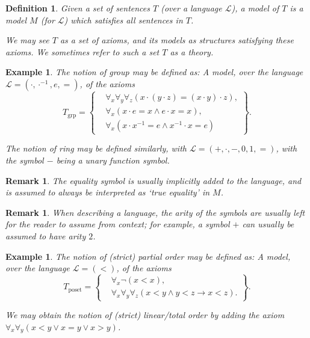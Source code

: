 \documentclass{article}
\newtheorem{remark}[theorem]{Remark}
\newtheorem{example}[theorem]{Example}
\newtheorem{definition}[theorem]{Definition}
\theoremstyle{nonumberplain}
\newcommand{\Lang}{\mathcal{L}}
\begin{document}
\begin{definition}
Given a set of sentences $T$ (over a language $\Lang$), a \emph{model of $T$} is a model $M$ (for $\Lang$) which satisfies all sentences in $T$.

We may see $T$ as a set of axioms, and its models as structures satisfying these axioms. We sometimes refer to such a set $T$ as a \emph{theory}.
\end{definition}

\begin{example}\label{ex:1}
The notion of group may be defined as: A model, over the language $\Lang = (\cdot, \cdot^{-1}, e, =)$, of the axioms
\begin{equation}
T_{\text{grp}} = \left\{
\begin{aligned}
&\forall_x \forall_y \forall_z (x \cdot (y \cdot z) = (x \cdot y) \cdot z),\\
&\forall_x (x \cdot e = x \land e \cdot x = x),\\
&\forall_x (x \cdot x^{-1} = e \land x^{-1} \cdot x = e)
\end{aligned}\right\}.
\end{equation}

The notion of ring may be defined similarly, with $\Lang = (+,\cdot,-,0,1, =)$, with the symbol $-$ being a unary function symbol.
\end{example}

\begin{remark}
The equality symbol is usually implicitly added to the language, and is assumed to always be interpreted as `true equality' in $M$.
\end{remark}

\begin{remark}
When describing a language, the arity of the symbols are usually left for the reader to assume from context; for example, a symbol $+$ can usually be assumed to have arity $2$.
\end{remark}

\begin{example}
The notion of (strict) partial order may be defined as: A model, over the language $\Lang = (<)$, of the axioms
\begin{equation}
T_{\text{poset}} = \left\{
\begin{aligned}
&\forall_x \neg(x<x),\\
&\forall_x \forall_y \forall_z (x < y \land y < z \rightarrow x<z).
\end{aligned}\right\}.
\end{equation}

We may obtain the notion of (strict) linear/total order by adding the axiom $\forall_x \forall_y (x<y \lor x=y \lor x>y)$.
\end{example}
\end{document}

